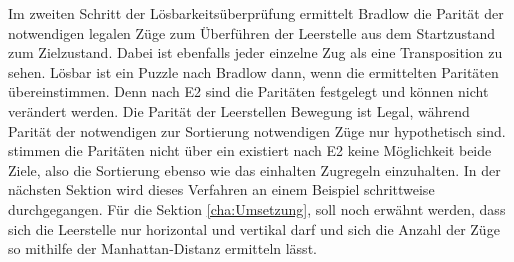 Im zweiten Schritt der Lösbarkeitsüberprüfung ermittelt Bradlow die Parität der notwendigen legalen Züge zum Überführen der Leerstelle aus dem Startzustand zum Zielzustand. Dabei ist ebenfalls jeder einzelne Zug als eine Transposition zu sehen.\WNL%
Lösbar ist ein Puzzle nach Bradlow dann, wenn die ermittelten Paritäten übereinstimmen. Denn nach E2 sind die Paritäten festgelegt und können nicht verändert werden. Die Parität der Leerstellen Bewegung ist Legal, während Parität der notwendigen zur Sortierung notwendigen Züge nur hypothetisch sind. stimmen die Paritäten nicht über ein existiert nach E2 keine Möglichkeit beide Ziele, also die Sortierung ebenso wie das einhalten Zugregeln einzuhalten.
\WNL
In der nächsten Sektion wird dieses Verfahren an einem Beispiel schrittweise durchgegangen.
\WNL
Für die Sektion \ref*{cha:Umsetzung}, soll noch erwähnt werden, dass sich die Leerstelle nur horizontal und vertikal  darf und sich die Anzahl der Züge so mithilfe der Manhattan-Distanz ermitteln lässt.

